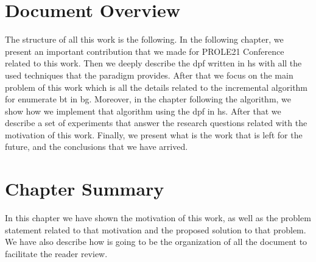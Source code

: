 \section{Document Overview}
The structure of all this work is the following. In the following chapter, we present an important contribution that we made for PROLE21 Conference~\cite{prole21} related to 
this work. Then we deeply describe the \acrshort{dpf} written in \acrshort{hs} with all the used techniques that the paradigm provides.
After that we focus on the main problem of this work which is all the details related to the incremental algorithm for enumerate \acrshort{bt} in \acrshort{bg}.
Moreover, in the chapter following the algorithm, we show how we implement that algorithm using the \acrshort{dpf} in \acrshort{hs}. After that we describe a set 
of experiments that answer the research questions related with the motivation of this work. Finally, we present what is the work that is left for the future, and the conclusions that
we have arrived.

\section{Chapter Summary}
In this chapter we have shown the motivation of this work, as well as the problem statement related to that motivation and the proposed solution to that problem.
We have also describe how is going to be the organization of all the document to facilitate the reader review.
